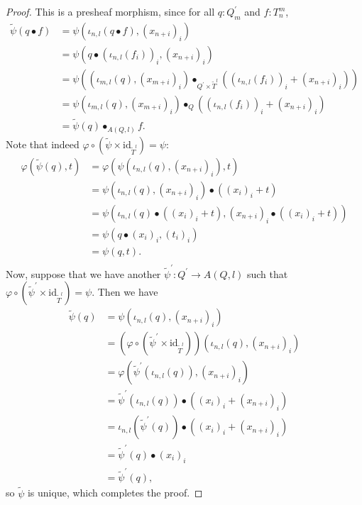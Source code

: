 \documentclass[a4paper]{amsbook}
\theoremstyle{definition}
\theoremstyle{remark}
\newcommand{\id}[1]{\ensuremath{\text{id}_{#1}}}
\begin{document}
\begin{proof}
    This is a presheaf morphism, since for all $ q: Q^\prime_m $ and $ f : T_n^m $,
    \begin{align*}
      \tilde \psi(q \bullet f) &= \psi(\iota_{n, l}(q \bullet f), (x_{n + i})_i)\\
      &= \psi(q \bullet (\iota_{n, l}(f_i))_i, (x_{n + i})_i)\\
      &= \psi((\iota_{m, l}(q), (x_{m + i})_i) \bullet_{Q^\prime \times \tilde T^l} ((\iota_{n, l}(f_i))_i + (x_{n + i})_i))\\
      &= \psi(\iota_{m, l}(q), (x_{m + i})_i) \bullet_Q ((\iota_{n, l}(f_i))_i + (x_{n + i})_i)\\
      &= \tilde \psi(q) \bullet_{A(Q, l)} f.
    \end{align*}
    Note that indeed $ \varphi \circ (\tilde \psi \times \id{\tilde T^l}) = \psi $:
    \begin{align*}
      \varphi(\tilde \psi(q), t) &= \varphi(\psi(\iota_{n, l}(q), (x_{n + i})_i), t)\\
      &= \psi(\iota_{n, l}(q), (x_{n + i})_i) \bullet ((x_i)_i + t)\\
      &= \psi(\iota_{n, l}(q) \bullet ((x_i)_i + t), (x_{n + i})_i \bullet ((x_i)_i + t))\\
      &= \psi(q \bullet (x_i)_i, (t_i)_i)\\
      &= \psi(q, t).\\
    \end{align*}
    Now, suppose that we have another $ \tilde \psi^\prime : Q^\prime \to A(Q, l) $ such that $ \varphi \circ (\tilde \psi^\prime \times \id{\tilde T^l}) = \psi $. Then we have
    \begin{align*}
      \tilde \psi(q) &= \psi(\iota_{n, l}(q), (x_{n + i})_i)\\
      &= (\varphi \circ (\tilde \psi^\prime \times \id{\tilde T^l}))(\iota_{n, l}(q), (x_{n + i})_i)\\
      &= \varphi(\tilde \psi^\prime(\iota_{n, l}(q)), (x_{n + i})_i)\\
      &= \tilde \psi^\prime(\iota_{n, l}(q)) \bullet ((x_i)_i + (x_{n + i})_i)\\
      &= \iota_{n, l}(\tilde \psi^\prime(q)) \bullet ((x_i)_i + (x_{n + i})_i)\\
      &= \tilde \psi^\prime(q) \bullet (x_i)_i\\
      &= \tilde \psi^\prime(q),
    \end{align*}
    so $ \tilde \psi $ is unique, which completes the proof.
  \end{proof}
\end{document}
